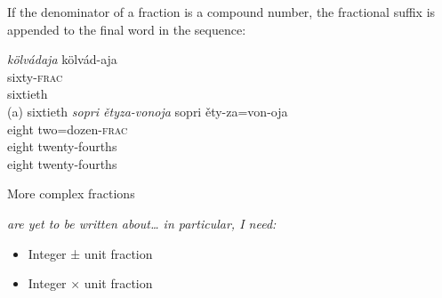 \documentclass[grammar]{subfiles}
\begin{document}
	If the denominator of a fraction is a compound number, the fractional suffix is appended to the final word in the sequence:

	\begin{exe}
		\ex
		\begin{xlist}
			\ex \textit{kölvádaja}
			\glll kölvád-aja\\
			sixty\textsc{-frac}\\
			sixtieth\\
			\glt (a) sixtieth
			\ex \textit{sopri ětyza-vonoja}
			\glll sopri ěty-za=von-oja\\
			eight two=dozen\textsc{-frac}\\
			eight twenty-fourths\\
			\glt eight twenty-fourths
		\end{xlist}
	\end{exe}


	More complex fractions {\em are yet to be written about… in particular, I need:
		\begin{itemize}
			\item Integer ± unit fraction
			\item Integer × unit fraction
		\end{itemize}
	}


	
\end{document}
